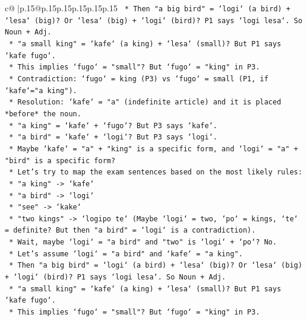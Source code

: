 \documentclass{article}
\begin{document}
{\begin{supertabular}{c@{$\;$}|p{.15\linewidth}@{}p{.15\linewidth}p{.15\linewidth}p{.15\linewidth}p{.15\linewidth}p{.15\linewidth}}
{{{\texttt{                        *   Then "a big bird" = `logi` (a bird) + `lesa` (big)? Or `lesa` (big) + `logi` (bird)? P1 says `logi lesa`. So Noun + Adj.} \\
\texttt{                        *   "a small king" = `kafe` (a king) + `lesa` (small)? But P1 says `kafe fugo`.} \\
\texttt{                        *   This implies `fugo` = "small"? But `fugo` = "king" in P3.} \\
\texttt{                        *   Contradiction: `fugo` = king (P3) vs `fugo` = small (P1, if `kafe`="a king").} \\
\texttt{                        *   Resolution: `kafe` = "a" (indefinite article) and it is placed *before* the noun.} \\
\texttt{                            *   "a king" = `kafe` + `fugo`? But P3 says `kafe`.} \\
\texttt{                            *   "a bird" = `kafe` + `logi`? But P3 says `logi`.} \\
\texttt{                        *   Maybe `kafe` = "a" + "king" is a specific form, and `logi` = "a" + "bird" is a specific form?} \\
\texttt{                        *   Let's try to map the exam sentences based on the most likely rules:} \\
\texttt{                            *   "a king" {-}> `kafe`} \\
\texttt{                            *   "a bird" {-}> `logi`} \\
\texttt{                            *   "see" {-}> `kake`} \\
\texttt{                            *   "two kings" {-}> `logipo te` (Maybe `logi` = two, `po` = kings, `te` = definite? But then "a bird" = `logi` is a contradiction).} \\
\texttt{                            *   Wait, maybe `logi` = "a bird" and "two" is `logi` + `po`? No.} \\
\texttt{                            *   Let's assume `logi` = "a bird" and `kafe` = "a king".} \\
\texttt{                            *   Then "a big bird" = `logi` (a bird) + `lesa` (big)? Or `lesa` (big) + `logi` (bird)? P1 says `logi lesa`. So Noun + Adj.} \\
\texttt{                            *   "a small king" = `kafe` (a king) + `lesa` (small)? But P1 says `kafe fugo`.} \\
\texttt{                            *   This implies `fugo` = "small"? But `fugo` = "king" in P3.} \\
}}}
\end{supertabular}}
\end{document}
